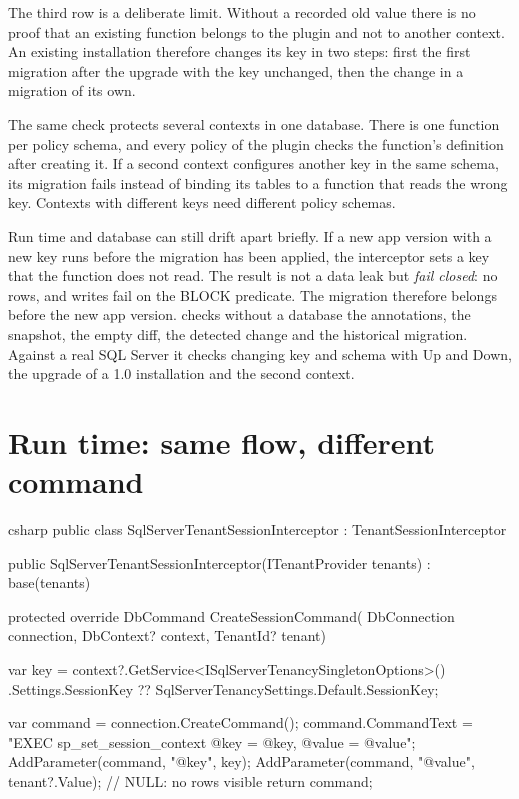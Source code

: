 The third row is a deliberate limit. Without a recorded old value there is no proof that an
existing function belongs to the plugin and not to another context. An existing installation
therefore changes its key in two steps: first the first migration after the upgrade with the key
unchanged, then the change in a migration of its own.

The same check protects several contexts in one database. There is one function per policy
schema, and every policy of the plugin checks the function's definition after creating it. If a
second context configures another key in the same schema, its migration fails instead of binding
its tables to a function that reads the wrong key. Contexts with different keys need different
policy schemas.

Run time and database can still drift apart briefly. If a new app version with a new key runs
before the migration has been applied, the interceptor sets a key that the function does not
read. The result is not a data leak but \emph{fail closed}: no rows, and writes fail on the BLOCK
predicate. The migration therefore belongs before the new app version.
 checks
without a database the annotations, the snapshot, the empty diff, the detected change and the
historical migration. Against a real SQL Server it checks changing key and schema with Up and
Down, the upgrade of a 1.0 installation and the second context.

\section{Run time: same flow, different command}

\begin{sourcecode}{csharp}
public class SqlServerTenantSessionInterceptor : TenantSessionInterceptor
{
    public SqlServerTenantSessionInterceptor(ITenantProvider tenants)
        : base(tenants)
    {
    }

    protected override DbCommand CreateSessionCommand(
        DbConnection connection, DbContext? context, TenantId? tenant)
    {
        var key = context?.GetService<ISqlServerTenancySingletonOptions>()
                      .Settings.SessionKey
                  ?? SqlServerTenancySettings.Default.SessionKey;

        var command = connection.CreateCommand();
        command.CommandText = "EXEC sp_set_session_context @key = @key, @value = @value";
        AddParameter(command, "@key", key);
        AddParameter(command, "@value", tenant?.Value);    // NULL: no rows visible
        return command;
    }
}
\end{sourcecode}

